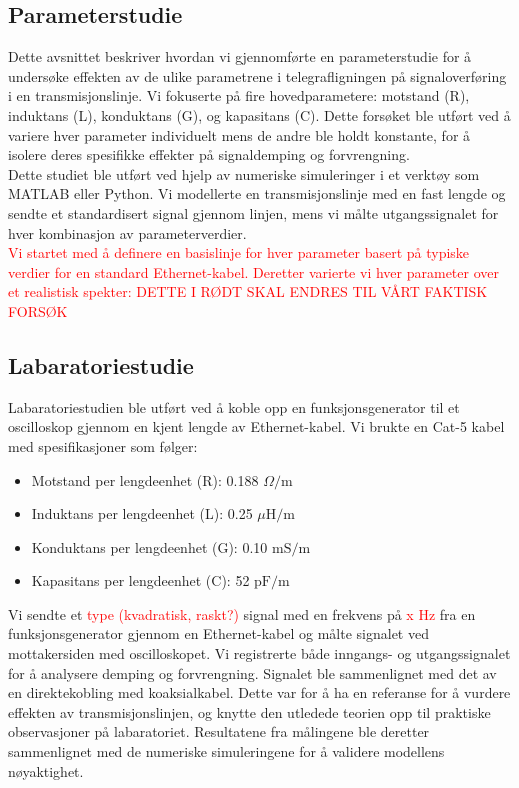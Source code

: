 \subsection{Parameterstudie}

Dette avsnittet beskriver hvordan vi gjennomførte en parameterstudie for å undersøke effekten av de ulike parametrene i telegrafligningen på signaloverføring i en transmisjonslinje. Vi fokuserte på fire hovedparametere: motstand (R), induktans (L), konduktans (G), og kapasitans (C). Dette forsøket ble utført ved å variere hver parameter individuelt mens de andre ble holdt konstante, for å isolere deres spesifikke effekter på signaldemping og forvrengning. \\ Dette studiet ble utført ved hjelp av numeriske simuleringer i et verktøy som MATLAB eller Python. Vi modellerte en transmisjonslinje med en fast lengde og sendte et standardisert signal gjennom linjen, mens vi målte utgangssignalet for hver kombinasjon av parameterverdier. \\ \textcolor{red}{Vi startet med å definere en basislinje for hver parameter basert på typiske verdier for en standard Ethernet-kabel. Deretter varierte vi hver parameter over et realistisk spekter: DETTE I RØDT SKAL ENDRES TIL VÅRT FAKTISK FORSØK}

\subsection{Labaratoriestudie}

Labaratoriestudien ble utført ved å koble opp en funksjonsgenerator til et oscilloskop gjennom en kjent lengde av Ethernet-kabel. Vi brukte en Cat-5 kabel med spesifikasjoner som følger:
\begin{itemize}
    \item Motstand per lengdeenhet (R): 0.188 $\Omega/\mathrm{m}$
    \item Induktans per lengdeenhet (L): 0.25 $\mu \mathrm{H}/\mathrm{m}$
    \item Konduktans per lengdeenhet (G): 0.10 $\mathrm{mS}/\mathrm{m}$
    \item Kapasitans per lengdeenhet (C): 52 $\mathrm{pF}/\mathrm{m}$
\end{itemize}
Vi sendte et \textcolor{red}{type (kvadratisk, raskt?)} signal med en frekvens på \textcolor{red}{x Hz} fra en funksjonsgenerator gjennom en Ethernet-kabel og målte signalet ved mottakersiden med oscilloskopet. Vi registrerte både inngangs- og utgangssignalet for å analysere demping og forvrengning. Signalet ble sammenlignet med det av en direktekobling med koaksialkabel. Dette var for å ha en referanse for å vurdere effekten av transmisjonslinjen, og knytte den utledede teorien opp til praktiske observasjoner på labaratoriet. Resultatene fra målingene ble deretter sammenlignet med de numeriske simuleringene for å validere modellens nøyaktighet.
